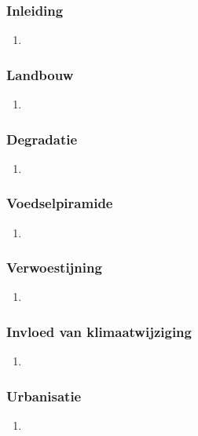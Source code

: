 \documentclass[12pt]{article}
\begin{document}
    \subsubsection{Inleiding}
    \begin{enumerate}
        \item 
    \end{enumerate}

    \subsubsection{Landbouw}
    \begin{enumerate}
        \item 
    \end{enumerate}

    \subsubsection{Degradatie}
    \begin{enumerate}
        \item 
    \end{enumerate}

    \subsubsection{Voedselpiramide}
    \begin{enumerate}
        \item 
    \end{enumerate}

    \subsubsection{Verwoestijning}
    \begin{enumerate}
        \item 
    \end{enumerate}

    \subsubsection{Invloed van klimaatwijziging}
    \begin{enumerate}
        \item 
    \end{enumerate}

    \subsubsection{Urbanisatie}
    \begin{enumerate}
        \item 
    \end{enumerate}
\end{document}
